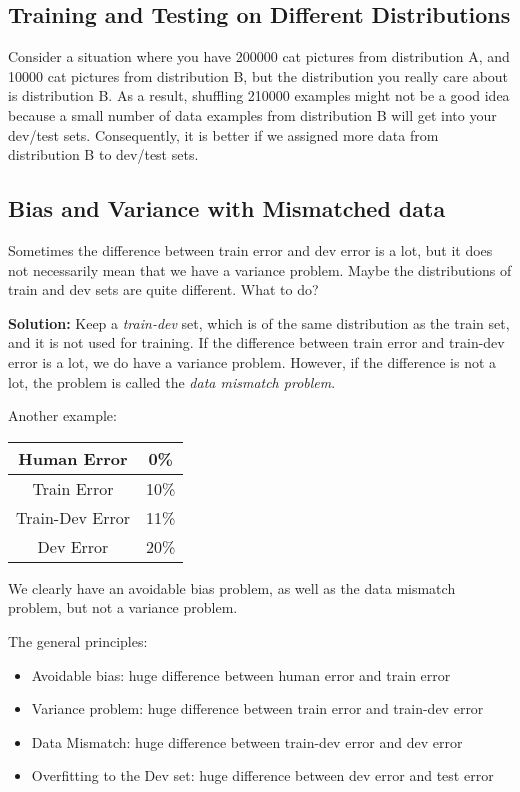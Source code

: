 \subsection{Training and Testing on Different Distributions}
Consider a situation where you have 200000 cat pictures from distribution A, and 10000 cat pictures from distribution B, 
but the distribution you really care about is distribution B.
As a result, shuffling 210000 examples might not be a good idea because a small number of data examples from distribution B will get into your dev/test sets. 
Consequently, it is better if we assigned more data from distribution B to dev/test sets. 

\subsection{Bias and Variance with Mismatched data}
Sometimes the difference between train error and dev error is a lot, but it does not necessarily mean that we have a variance problem. 
Maybe the distributions of train and dev sets are quite different. What to do?

\textbf{Solution:} Keep a \emph{train-dev} set, which is of the same distribution as the train set, and it is not used for training.
If the difference between train error and train-dev error is a lot, we do have a variance problem. 
However, if the difference is not a lot, the problem is called the \emph{data mismatch problem}.  


Another example: 
\begin{table}[H]
    \begin{tabular}{|c|c|}
    \hline
    Human Error & 0\%  \\ \hline
    Train Error          &  10\%   \\ \hline
    Train-Dev Error      & 11\% \\ \hline
    Dev Error          & 20\% \\ \hline
    \end{tabular}
\end{table}

We clearly have an avoidable bias problem, as well as the data mismatch problem, but not a variance problem. 

The general principles: 
\begin{itemize}
    \item Avoidable bias: huge difference between human error and train error
    \item Variance problem: huge difference between train error and train-dev error
    \item Data Mismatch: huge difference between train-dev error and dev error
    \item Overfitting to the Dev set: huge difference between dev error and test error
\end{itemize}

